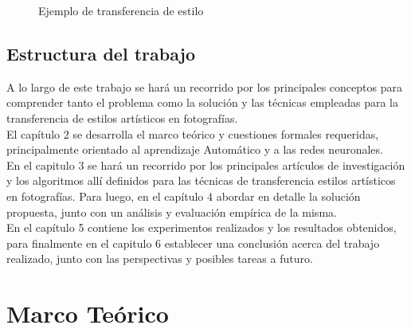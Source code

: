 \documentclass[a4paper,11pt,spanish]{book}
\begin{document}
\begin{figure}[h]

    \caption{Ejemplo de transferencia de estilo}
    \label{fig:style_transfer_candy_tower}
    \end{figure}

  \section {Estructura del trabajo}
    A lo largo de este trabajo se hará un recorrido por los principales conceptos para comprender tanto el problema como la solución y las técnicas empleadas para la transferencia
    de estilos artísticos en fotografías.\\
    El capítulo 2 se desarrolla el marco teórico y cuestiones formales requeridas, principalmente orientado al aprendizaje Automático y a las redes neuronales.\\
    En el capitulo 3 se hará un recorrido por los principales artículos de investigación y los algoritmos allí definidos para las técnicas de transferencia estilos artísticos en fotografías.
    Para luego, en el capítulo 4 abordar en detalle la solución propuesta, junto con un análisis y evaluación empírica de la misma.\\
    En el capítulo 5 contiene los experimentos realizados y los resultados obtenidos, para finalmente en el capitulo 6 establecer una conclusión acerca del trabajo realizado,
    junto con las perspectivas y posibles tareas a futuro.

\chapter{Marco Teórico}
\end{document}
